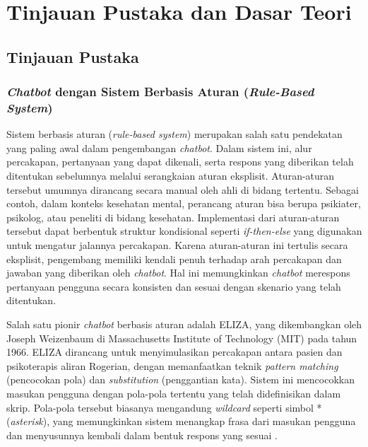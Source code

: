 \chapter{Tinjauan Pustaka dan Dasar Teori}

\section{Tinjauan Pustaka}
\subsection{\textit{Chatbot} dengan Sistem Berbasis Aturan (\textit{Rule-Based System})}
Sistem berbasis aturan (\textit{rule-based system}) merupakan salah satu pendekatan yang paling awal dalam pengembangan \textit{chatbot}.
Dalam sistem ini, alur percakapan, pertanyaan yang dapat dikenali, serta respons yang diberikan telah ditentukan sebelumnya melalui serangkaian aturan eksplisit.
Aturan-aturan tersebut umumnya dirancang secara manual oleh ahli di bidang tertentu.
Sebagai contoh, dalam konteks kesehatan mental, perancang aturan bisa berupa psikiater, psikolog, atau peneliti di bidang kesehatan.
Implementasi dari aturan-aturan tersebut dapat berbentuk struktur kondisional seperti \textit{if-then-else} yang digunakan untuk mengatur jalannya percakapan.
Karena aturan-aturan ini tertulis secara eksplisit, pengembang memiliki kendali penuh terhadap arah percakapan dan jawaban yang diberikan oleh \textit{chatbot}.
Hal ini memungkinkan \textit{chatbot} merespons pertanyaan pengguna secara konsisten dan sesuai dengan skenario yang telah ditentukan.

Salah satu pionir \textit{chatbot} berbasis aturan adalah ELIZA, yang dikembangkan oleh Joseph Weizenbaum di Massachusetts Institute of Technology (MIT) pada tahun 1966.
ELIZA dirancang untuk menyimulasikan percakapan antara pasien dan psikoterapis aliran Rogerian, dengan memanfaatkan teknik \textit{pattern matching} (pencocokan pola) dan \textit{substitution} (penggantian kata).
Sistem ini mencocokkan masukan pengguna dengan pola-pola tertentu yang telah didefinisikan dalam skrip. Pola-pola tersebut biasanya mengandung \textit{wildcard} seperti simbol * (\textit{asterisk}), yang memungkinkan sistem menangkap frasa dari masukan pengguna dan menyusunnya kembali dalam bentuk respons yang sesuai \cite{Weizenbaum1966ELIZA}.

